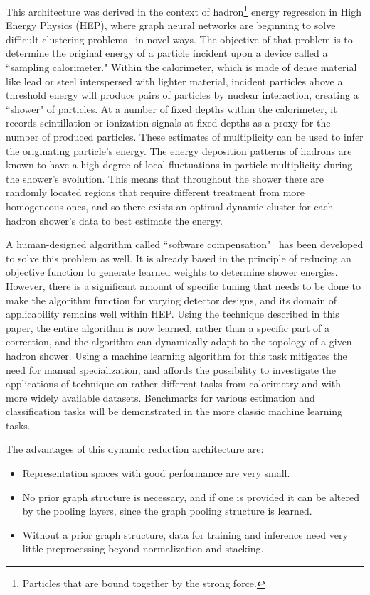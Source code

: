 \documentclass{article}
\begin{document}
This architecture was derived in the context of hadron\footnote{Particles that are bound together by the strong force.} energy regression in High Energy Physics (HEP), where graph neural networks are beginning to solve difficult clustering problems~\cite{gravnet, NEURIPS2019} in novel ways.
The objective of that problem is to determine the original energy of a particle incident upon a device called a ``sampling calorimeter." 
Within the calorimeter, which is made of dense material like lead or steel interspersed with lighter material, incident particles above a threshold energy will produce pairs of particles by nuclear interaction, creating a ``shower" of particles.
At a number of fixed depths within the calorimeter, it records scintillation or ionization signals at fixed depths as a proxy for the number of produced particles.
These estimates of multiplicity can be used to infer the originating particle's energy.
The energy deposition patterns of hadrons are known to have a high degree of local fluctuations in particle multiplicity during the shower's evolution.
This means that throughout the shower there are randomly located regions that require different treatment from more homogeneous ones, and so there exists an optimal dynamic cluster for each hadron shower's data to best estimate the energy.

A human-designed algorithm called ``software compensation"~\cite{Tran_2017} has been developed to solve this problem as well.
It is already based in the principle of reducing an objective function to generate learned weights to determine shower energies.
However, there is a significant amount of specific tuning that needs to be done to make the algorithm function for varying detector designs, and its domain of applicability remains well within HEP.
Using the technique described in this paper, the entire algorithm is now learned, rather than a specific part of a correction, and the algorithm can dynamically adapt to the topology of a given hadron shower.
Using a machine learning algorithm for this task mitigates the need for manual specialization, and affords the possibility to investigate the applications of technique on rather different tasks from calorimetry and with more widely available datasets.
Benchmarks for various estimation and classification tasks will be demonstrated in the more classic machine learning tasks.

The advantages of this dynamic reduction architecture are:
\begin{itemize}
    \item Representation spaces with good performance are very small.
    \item No prior graph structure is necessary, and if one is provided it can be altered by the pooling layers, since the graph pooling structure is learned.
    \item Without a prior graph structure, data for training and inference need very little preprocessing beyond normalization and stacking.
\end{itemize}
\end{document}
